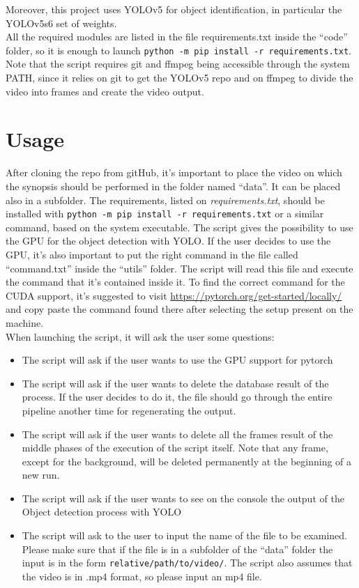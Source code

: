 \documentclass[conference]{IEEEtran}
\begin{document}
		Moreover, this project uses YOLOv5 for object identification, in particular the YOLOv5s6 set of weights.\\
		All the required modules are listed in the file requirements.txt inside the ``code'' folder, so it is enough to launch
		\texttt{python -m pip install -r requirements.txt}.\\
		Note that the script requires git and ffmpeg being accessible through the system PATH, since it relies on git to 
		get the YOLOv5 repo and on ffmpeg to divide the video into frames and create the video output.
		
	\section{Usage}
	
		After cloning the repo from gitHub, it's important to place the video on which the synopsis should be performed 
		in the folder named ``data''. It can be placed also in a subfolder. The requirements, listed on \textit{requirements.txt}, 
		should be installed with \texttt{python -m pip install -r requirements.txt} or a similar command, based on the system 
		executable. The script gives the possibility to use the GPU for the object detection with YOLO. If the user decides to 
		use the GPU, it's also important to put the right command in the file called ``command.txt'' inside the ``utils'' folder. 
		The script will read this file and execute the command that it's contained inside it. To find the correct command for the 
		CUDA support, it's suggested to visit \url{https://pytorch.org/get-started/locally/} and copy paste the command found there 
		after selecting the setup present on the machine.\\
		When launching the script, it will ask the user some questions: 
		\begin{itemize}
		
			\item The script will ask if the user wants to use the GPU support for pytorch
			\item The script will ask if the user wants to delete the database result of the process. If the user decides to do it, the 
				file should go through the entire pipeline another time for regenerating the output.
			\item The script will ask if the user wants to delete all the frames result of the middle phases of the execution of the script 
				itself. Note that any frame, except for the background, will be deleted permanently at the beginning of a new run.
			\item The script will ask if the user wants to see on the console the output of the Object detection process with YOLO
			\item The script will ask to the user to input the name of the file to be examined. Please make sure that if the file is in a 
			subfolder of the ``data'' folder the input is in the form \texttt{relative/path/to/video/}. The script also assumes that 
			the video is in .mp4 format, so please input an mp4 file.
		
		\end{itemize}
		
\end{document}
